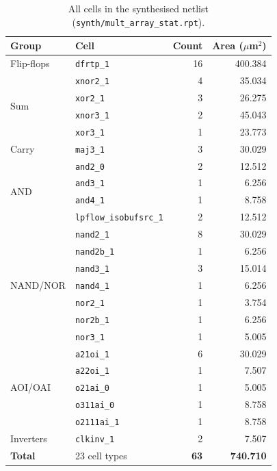 \documentclass[10pt,a4paper,twocolumn]{article}
\begin{document}
\begin{table}[!htbp]
\centering\scriptsize
\begin{tabular}{llrr}
\toprule
\textbf{Group} & \textbf{Cell} & \textbf{Count} & \textbf{Area ($\mu$m$^2$)} \\
\midrule
Flip-flops & \texttt{dfrtp\_1} & 16 & 400.384 \\
\midrule
\multirow{4}{*}{Sum} & \texttt{xnor2\_1} & 4 & 35.034 \\
 & \texttt{xor2\_1} & 3 & 26.275 \\
 & \texttt{xnor3\_1} & 2 & 45.043 \\
 & \texttt{xor3\_1} & 1 & 23.773 \\
\midrule
Carry & \texttt{maj3\_1} & 3 & 30.029 \\
\midrule
\multirow{4}{*}{AND} & \texttt{and2\_0} & 2 & 12.512 \\
 & \texttt{and3\_1} & 1 & 6.256 \\
 & \texttt{and4\_1} & 1 & 8.758 \\
 & \texttt{lpflow\_isobufsrc\_1} & 2 & 12.512 \\
\midrule
\multirow{7}{*}{NAND/NOR} & \texttt{nand2\_1} & 8 & 30.029 \\
 & \texttt{nand2b\_1} & 1 & 6.256 \\
 & \texttt{nand3\_1} & 3 & 15.014 \\
 & \texttt{nand4\_1} & 1 & 6.256 \\
 & \texttt{nor2\_1} & 1 & 3.754 \\
 & \texttt{nor2b\_1} & 1 & 6.256 \\
 & \texttt{nor3\_1} & 1 & 5.005 \\
\midrule
\multirow{5}{*}{AOI/OAI} & \texttt{a21oi\_1} & 6 & 30.029 \\
 & \texttt{a22oi\_1} & 1 & 7.507 \\
 & \texttt{o21ai\_0} & 1 & 5.005 \\
 & \texttt{o311ai\_0} & 1 & 8.758 \\
 & \texttt{o2111ai\_1} & 1 & 8.758 \\
\midrule
Inverters & \texttt{clkinv\_1} & 2 & 7.507 \\
\midrule
\textbf{Total} & 23 cell types & \textbf{63} & \textbf{740.710} \\
\bottomrule
\end{tabular}
\caption{All cells in the synthesised netlist (\texttt{synth/mult\_array\_stat.rpt}).}
\label{tab:cells}
\end{table}
\end{document}

